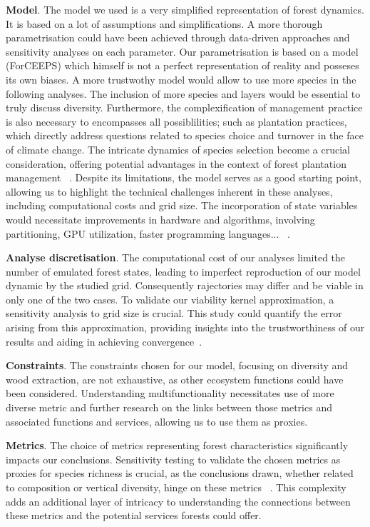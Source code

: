 \documentclass{article}
\begin{document}
\textbf{Model}. The model we used is a very simplified representation of forest dynamics. It is based on a lot of assumptions and simplifications. A more  thorough parametrisation could have been achieved through data-driven approaches and sensitivity analyses on each parameter. Our parametrisation is based on a model (ForCEEPS) which himself is not a perfect representation of reality and posseses its own biases. A  more trustwothy model would allow to use more species in the following analyses. The inclusion of more species and layers would be essential to truly discuss diversity. Furthermore, the complexification of management practice is also necessary to encompasses all possiblilities; such as plantation practices, which directly address questions related to species choice and turnover in the face of climate change. The intricate dynamics of species selection become a crucial consideration, offering potential advantages in the context of forest plantation management ~\autocite{brockerhoffPlantationForestsBiodiversity2008}. Despite its limitations, the model serves as a good starting point, allowing us to highlight the technical challenges inherent in these analyses, including computational costs and grid size. The incorporation of state variables would necessitate improvements in hardware and algorithms, involving partitioning, GPU utilization, faster programming languages... ~\autocite{briasAcceleratingViabilityKernel2016}.

\textbf{Analyse discretisation}. The computational cost of our analyses limited the number of emulated forest states, leading to imperfect reproduction of our model dynamic by the studied grid. Consequently rajectories may differ and be viable in only one of the two cases. To validate our viability kernel approximation, a sensitivity analysis to grid size is crucial. This study could quantify the error arising from this approximation, providing insights into the trustworthiness of our results and aiding in achieving convergence~\autocite{saint-pierreApproximationViabilityKernel1994}.

\textbf{Constraints}. The constraints chosen for our model, focusing on diversity and wood extraction, are not exhaustive, as other ecosystem functions could have been considered. Understanding multifunctionality necessitates use of more diverse metric and further research on the links between those metrics and associated functions and services, allowing us to use them as proxies.

\textbf{Metrics}. The choice of metrics representing forest characteristics significantly impacts our conclusions. Sensitivity testing to validate the chosen metrics as proxies for species richness is crucial, as the conclusions drawn, whether related to composition or vertical diversity, hinge on these metrics ~\autocite{juckerClimateModulatesEffects2016, guldinRoleUnevenAgedSilviculture1996, noletComparingEffectsEven2018}. This complexity adds an additional layer of intricacy to understanding the connections between these metrics and the potential services forests could offer.
\end{document}
